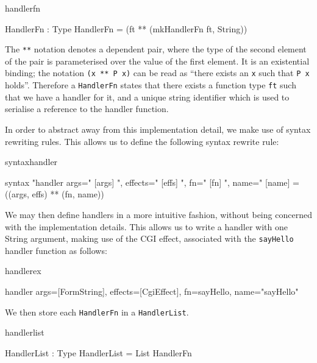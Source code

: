 \begin{SaveVerbatim}{handlerfn}

HandlerFn : Type
HandlerFn = (ft ** (mkHandlerFn ft, String))

\end{SaveVerbatim}

\noindent
The \texttt{**} notation denotes a dependent pair, where the type of the second
element of the pair is parameterised over the value of the first element. It is
an existential binding;
the notation \texttt{(x ** P x)} can be read as ``there exists an \texttt{x} such that 
\texttt{P x} holds''.
Therefore a \texttt{HandlerFn} states that there exists a function type
\texttt{ft} such that we have a handler for it, and a unique string identifier
which is used to serialise a
reference to the handler function. 

In order to abstract away from this implementation detail, we make use of
\idris{} syntax rewriting rules. This allows us to define the following syntax
rewrite rule:

\noindent
\begin{SaveVerbatim}{syntaxhandler}

syntax 
  "handler args=" [args] ", effects=" [effs] ", fn=" [fn] 
  ", name=" [name] = ((args, effs) ** (fn, name))

\end{SaveVerbatim}

\noindent
We may then define handlers in a more intuitive fashion, without being
concerned with the implementation details. This allows us to write a handler
with one String argument, making use of the CGI effect, associated with the
\texttt{sayHello} handler function as follows:

\begin{SaveVerbatim}{handlerex}

handler args=[FormString], 
        effects=[CgiEffect], 
        fn=sayHello, 
        name="sayHello"

\end{SaveVerbatim}

\noindent
We then store each \texttt{HandlerFn} in a \texttt{HandlerList}.

\begin{SaveVerbatim}{handlerlist}

HandlerList : Type
HandlerList = List HandlerFn

\end{SaveVerbatim}


